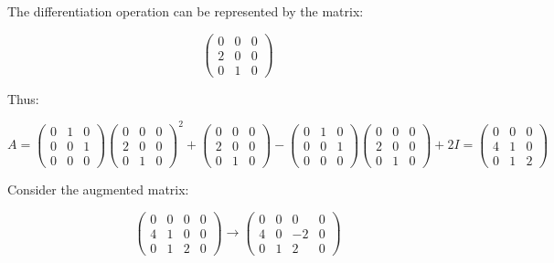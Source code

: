 \documentclass[12pt]{article}
\begin{document}
The differentiation operation can be represented by the matrix:

\begin{equation}
    \begin{pmatrix}
        0 & 0 & 0 \\
        2 & 0 & 0 \\
        0 & 1 & 0
    \end{pmatrix}
\end{equation}

Thus:

\begin{equation}
    A =
    \begin{pmatrix}
        0 & 1 & 0 \\
        0 & 0 & 1 \\
        0 & 0 & 0
    \end{pmatrix}
    \begin{pmatrix}
        0 & 0 & 0 \\
        2 & 0 & 0 \\
        0 & 1 & 0
    \end{pmatrix}^{2}
    +
    \begin{pmatrix}
        0 & 0 & 0 \\
        2 & 0 & 0 \\
        0 & 1 & 0
    \end{pmatrix}
    -
    \begin{pmatrix}
        0 & 1 & 0 \\
        0 & 0 & 1 \\
        0 & 0 & 0
    \end{pmatrix}
    \begin{pmatrix}
        0 & 0 & 0 \\
        2 & 0 & 0 \\
        0 & 1 & 0
    \end{pmatrix}
    + 2I
    =
    \begin{pmatrix}
        0 & 0 & 0 \\
        4 & 1 & 0 \\
        0 & 1 & 2
    \end{pmatrix}
\end{equation}

Consider the augmented matrix:

\begin{equation}
    \left( \begin{array}{ccc|c}
        0 & 0 & 0 & 0 \\
        4 & 1 & 0 & 0 \\
        0 & 1 & 2 & 0
    \end{array} \right)
    \to
    \left( \begin{array}{ccc|ccc}
        0 & 0 & 0  & 0 \\
        4 & 0 & -2 & 0 \\
        0 & 1 & 2  & 0
    \end{array} \right)
\end{equation}
\end{document}
